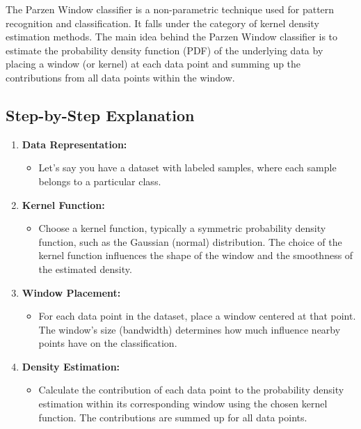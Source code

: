 \documentclass[9pt,twocolumn]{paper-template}
\begin{document}
The Parzen Window classifier is a non-parametric technique used for pattern recognition and classification. It falls under the category of kernel density estimation methods. The main idea behind the Parzen Window classifier is to estimate the probability density function (PDF) of the underlying data by placing a window (or kernel) at each data point and summing up the contributions from all data points within the window.

\subsection*{Step-by-Step Explanation}

\begin{enumerate}[label={\arabic*.}, font=\bfseries]
	
	\item \textbf{Data Representation:}
	\begin{itemize}
		\item Let's say you have a dataset with labeled samples, where each sample belongs to a particular class.
	\end{itemize}
	
	\item \textbf{Kernel Function:}
	\begin{itemize}
		\item Choose a kernel function, typically a symmetric probability density function, such as the Gaussian (normal) distribution. The choice of the kernel function influences the shape of the window and the smoothness of the estimated density.
	\end{itemize}
	
	\item \textbf{Window Placement:}
	\begin{itemize}
		\item For each data point in the dataset, place a window centered at that point. The window's size (bandwidth) determines how much influence nearby points have on the classification.
	\end{itemize}
	
	\item \textbf{Density Estimation:}
	\begin{itemize}
		\item Calculate the contribution of each data point to the probability density estimation within its corresponding window using the chosen kernel function. The contributions are summed up for all data points.
	\end{itemize}
	

\end{enumerate}
\end{document}
